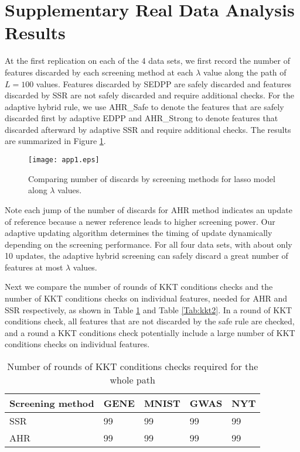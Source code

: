 \appendix
\appendixpage

\section{Supplementary Real Data Analysis Results}
\label{sec:ap}

At the first replication on each of the 4 data sets, we first record the number of features discarded by each screening method at each $\lambda$ value along the path of $L=100$ values. Features discarded by SEDPP are safely discarded and features discarded by SSR are not safely discarded and require additional checks. For the adaptive hybrid rule, we use AHR\_Safe to denote the features that are safely discarded first by adaptive EDPP and AHR\_Strong to denote features that discarded afterward by adaptive SSR and require additional checks. The results are summarized in Figure \ref{fig:ap1}.

\begin{figure}[H]
    \centering
    \texttt{[image: app1.eps]}    \caption{Comparing number of discards by screening methods for lasso model along $\lambda$ values.}
    \label{fig:ap1}
\end{figure}

Note each jump of the number of discards for AHR method indicates an update of reference because a newer reference leads to higher screening power. Our adaptive updating algorithm determines the timing of update dynamically depending on the screening performance. For all four data sets, with about only 10 updates, the adaptive hybrid screening can safely discard a great number of features at most $\lambda$ values.

Next we compare the number of rounds of KKT conditions checks and the number of KKT conditions checks on individual features, needed for AHR and SSR respectively, as shown in Table \ref{Tab:kkt1} and Table \ref{Tab:kkt2}. In a round of KKT conditions check, all features that are not discarded by the safe rule are checked, and a round a KKT conditions check potentially include a large number of KKT conditions checks on individual features. 

\begin{table}[H]
\centering
\begin{tabular}{lllll}
\toprule
Screening method & GENE & MNIST & GWAS & NYT \\
\midrule
SSR & 99 & 99 & 99 & 99 \\
AHR & 99 & 99 & 99 & 99 \\
\bottomrule
\end{tabular}
\caption{Number of rounds of KKT conditions checks required for the whole path}
\label{Tab:kkt1}
\end{table}

